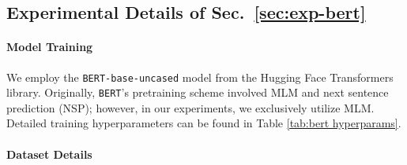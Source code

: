 \documentclass{article} %
\begin{document}
\begin{appendices}{}
\subsection{Experimental Details of Sec.~\ref{sec:exp-bert}}
\label{sec:appendix_exp_details_bert}



\paragraph{Model Training} We employ the \texttt{BERT-base-uncased} model from the Hugging Face Transformers library. Originally, \texttt{BERT}'s pretraining scheme involved MLM and next sentence prediction (NSP); however, in our experiments, we exclusively utilize MLM. Detailed training hyperparameters can be found in Table \ref{tab:bert hyperparams}.
\begin{table}[h]
\end{table}


\paragraph{Dataset Details}


\end{appendices}
\end{document}
